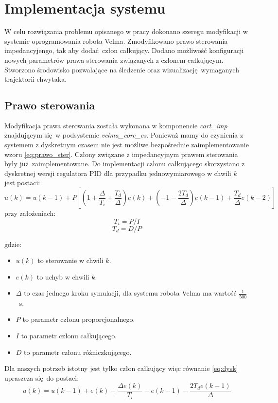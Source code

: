 
\chapter{Implementacja systemu \label{chap:specyfikacja_systemu}}
W celu rozwiązania problemu opisanego w pracy dokonano szeregu modyfikacji w systemie oprogramowania robota Velma. Zmodyfikowano prawo sterowania impedancyjengo, tak aby dodać człon całkujący. Dodano możliwość konfiguracji nowych parametrów prawa sterowania związanych z członem całkującym. Stworzono środowisko pozwalające na śledzenie oraz wizualizację wymaganych trajektorii chwytaka.

\section{Prawo sterowania}
Modyfikacja prawa sterowania została wykonana w komponencie \textit{cart\_imp} znajdującym się w podsystemie \textit{velma\_core\_cs}. Ponieważ mamy do czynienia z systemem z dyskretnym czasem nie jest możliwe bezpośrednie zaimplementowanie wzoru \ref{eq:prawo_ster}. Człony związane z impedancyjnym prawem sterowania były już zaimplementowane. Do implementacji członu całkującego skorzystano z dyskretnej wersji regulatora PID \cite{wiki:PID_controller} dla przypadku jednowymiarowego w chwili $k$ jest postaci:
\begin{equation}
\label{eq:dysk}
u(k) = u(k-1) + P[(1 + \frac{\Delta}{T_i} + \frac{T_d}{\Delta})e(k) + (-1-\frac{2T_d}{\Delta})e(k-1) + \frac{T_d}{\Delta}e(k-2)]
\end{equation}
przy założeniach:
\begin{equation}
T_i = P/I
\end{equation}
\begin{equation}
T_d = D/P
\end{equation}

gdzie:
\begin{itemize}
	\item $u(k)$ to sterowanie w chwili $k$.
	\item $e(k)$ to uchyb w chwili $k$.
	\item $\Delta$ to czas jednego kroku symulacji, dla systemu robota Velma ma wartość $\frac{1}{500}$~s.
	\item $P$ to parametr członu proporcjonalnego.
	\item $I$ to parametr członu całkującego.
	\item $D$ to parametr członu różniczkującego.
\end{itemize}
Dla naszych potrzeb istotny jest tylko człon całkujący więc równanie \ref{eq:dysk} upraszcza się do postaci:
\begin{equation}
\label{eq:dysk_cal}
	u(k) = u(k-1) + e(k)+\frac{\Delta e(k)}{T_i} - e(k-1) -\frac{2T_de(k-1)}{\Delta} 
\end{equation}

